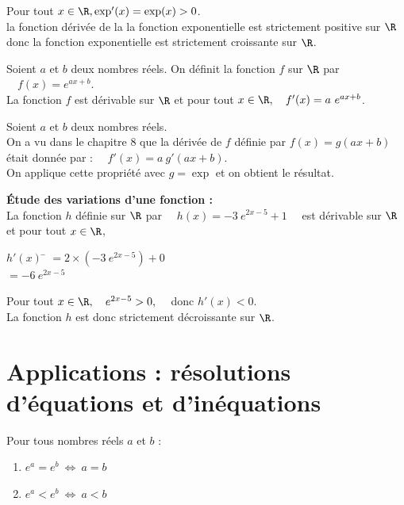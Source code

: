 \documentclass[a4paper,11pt,cours]{nsi} %
\begin{document}
\begin{demonstration}
	Pour tout $x\in\R, \exp'(x)=\exp(x)>0$.\\
	la fonction dérivée de la la fonction exponentielle est strictement positive sur $\R$ donc la fonction exponentielle est strictement croissante sur $\R$.
\end{demonstration}

\begin{propriete}[ ]
	Soient $a$ et $b$ deux nombres réels. On définit la fonction $f$ sur $\R$ par $\quad f(x)=e^{ax+b}$.\\
	La fonction $f$ est dérivable sur $\R$ et pour tout $x\in \R, \quad f'(x)=a\ e^{ax+b}$.
\end{propriete}
\begin{demonstration}
	Soient $a$ et $b$ deux nombres réels.\\
	On a vu dans le chapitre 8 que la dérivée de $f$ définie par $f(x)=g(ax+b)$ était donnée par : $\quad f'(x)=a\ g'(ax+b)$.\\
	On applique cette propriété avec $g=\exp$ et on obtient le résultat.
\end{demonstration}

\begin{exemple}[ ]
	\textbf{\'Etude des variations d'une fonction :}\\
	La fonction $h$ définie sur $\R$ par $\quad h(x)=-3\ e^{2x-5}+1\quad$ est dérivable sur $\R$ et pour tout $x\in\R$,
	\begin{tabbing}
		$h'(x)$	\= $=2\times \left(-3\ e^{2x-5}\right)+0$\\
		\>	$=-6\ e^{2x-5}$
	\end{tabbing}
	Pour tout $x\in\R, \quad e^{2x-5}>0,\quad$ donc $h'(x)<0$.\\
	La fonction $h$ est donc strictement décroissante sur $\R$.
\end{exemple}

\section{Applications : résolutions d'équations et d'inéquations}

\begin{propriete}[s]
Pour tous nombres réels $a$ et $b$ :
\begin{multicols}{2}
	\begin{enumerate}[label=\textbullet]
		\item 	$e^{a}=e^{b}\ \Leftrightarrow\ a=b$
		\item 	$e^{a}<e^{b}\ \Leftrightarrow\ a<b$
	\end{enumerate}
\end{multicols}
\end{propriete}
\end{document}
